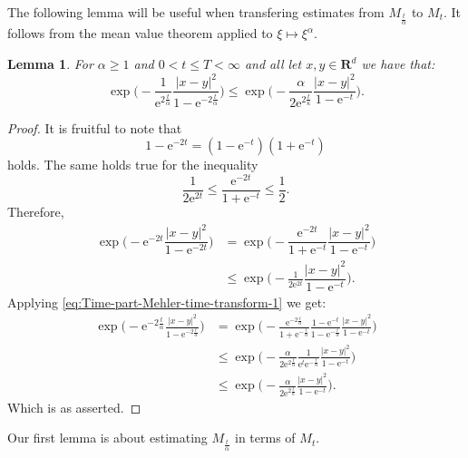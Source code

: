\documentclass[a4paper,oneside,10pt]{amsproc}
\newtheorem{lemma}{Lemma}
\theoremstyle{remark}
\renewcommand{\leq}{\leqslant}
\renewcommand{\leq}{\leqslant}
\renewcommand{\geq}{\geqslant}
\newcommand{\R}{\mathbf R}
\newcommand{\e}{\mathrm{e}} %
\renewcommand{\leq}{\leqslant}%
\renewcommand{\geq}{\geqslant}%
\begin{document}
The following lemma will be useful when transfering estimates from
$M_{\frac{t}{\alpha}}$ to $M_t$. It follows from the mean value
theorem applied to $\xi \mapsto \xi^\alpha$.
\begin{lemma}\label{lem:Exponential-estimates}
  For $\alpha \geq 1$ and $0 < t \leq T < \infty$ and all let $x, y \in \R^d$
  we have that:
  \begin{equation}
    \label{eq:Exponential-estimates-1}
    \exp \biggl (-\frac1{\e^{2\frac{t}\alpha}} \frac{|x - y|^2}{1 - \e^{-2\frac{t}\alpha}}
    \biggr ) \leq \exp \biggl(-\frac{\alpha}{2\e^{2\frac{t}\kappa}} \frac{|x -
      y|^2}{1 - \e^{-t}} \biggr).
  \end{equation}
\end{lemma}
\begin{proof}
  It is fruitful to note that
  \begin{equation*}
    1 - \e^{-2t} = (1 - \e^{-t})(1 + \e^{-t})
  \end{equation*}
  holds. The same holds true for the inequality
  \begin{equation*}
    \frac1{2 \e^{2t}} \leq \frac{\e^{-2t}}{1 + \e^{-t}} \leq \frac12.
  \end{equation*}
  Therefore,
  \begin{align*}
    \exp\biggl(-\e^{-2t} \dfrac{|x - y|^2}{1 - \e^{-2 t}} \biggr)
    &= \exp\biggl(-\dfrac{\e^{-2t}}{1 + \e^{-t}} \dfrac{|x -
      y|^2}{1 - \e^{-t}} \biggr)\\
    &\leq \exp\biggl(-\frac1{2\e^{2t}} \dfrac{|x - y|^2}{1 - \e^{-t}} \biggr).
  \end{align*}
  Applying \eqref{eq:Time-part-Mehler-time-transform-1} we get:
  \begin{align*}
    \exp \biggl (-\e^{-2\frac{t}\alpha} \frac{|x - y|^2}{1 - \e^{-2\frac{t}\alpha}}
    \biggr ) &= \exp \biggl (-\frac{\e^{-2\frac{t}\alpha}}{1 + \e^{-\frac{t}\alpha}} \frac{1 - \e^{-t}}{1 -
      \e^{-\frac{t}\alpha}}  \frac{|x - y|^2}{1 - \e^{-t}} \biggr )\\
    &\leq \exp \biggl(-\frac{\alpha}{2\e^{2\frac{t}{\alpha}}}
    \frac1{\e^t \e^{-\frac{t}\alpha}} \frac{|x - y|^2}{1 - \e^{-t}}
    \biggr)\\
    &\leq \exp \biggl(-\frac{\alpha}{2\e^{2\frac{t}\kappa}} \frac{|x -
      y|^2}{1 - \e^{-t}} \biggr).
  \end{align*}
  Which is as asserted.
\end{proof}
Our first lemma is about estimating $M_{\frac{t}\alpha}$ in terms of
$M_{t}$.
\end{document}
